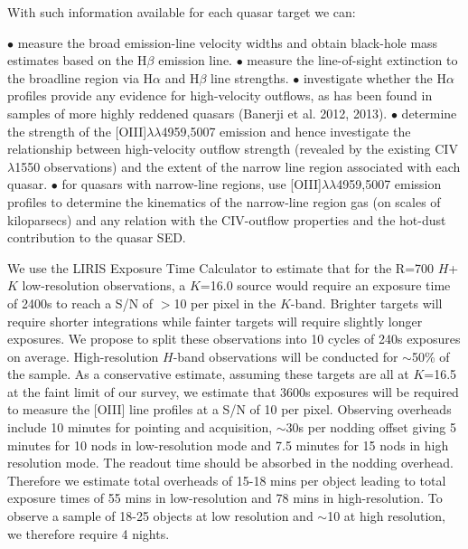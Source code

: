 With such information available for each quasar target we can:

$\bullet$ measure the broad emission-line velocity widths and obtain 
black-hole mass estimates based on the H$\beta$ emission line.\newline
$\bullet$ measure the line-of-sight extinction to the broadline region
via H$\alpha$ and H$\beta$ line strengths.\newline
$\bullet$ investigate whether the H$\alpha$ profiles provide any
evidence for high-velocity outflows, as has been found in samples of
more highly reddened quasars (Banerji et al. 2012, 2013).\newline
$\bullet$ determine the strength of the
[OIII]$\lambda\lambda$4959,5007 emission and hence investigate the
relationship between high-velocity outflow strength (revealed by the existing
CIV$\lambda$1550 observations) and the extent of the narrow line
region associated with each quasar.\newline
$\bullet$ for quasars with narrow-line regions, use 
[OIII]$\lambda\lambda$4959,5007 emission profiles to determine the
kinematics of the narrow-line region gas (on scales of kiloparsecs)
and any relation with the CIV-outflow properties and the hot-dust
contribution to the quasar SED.\newline

We use the LIRIS Exposure Time Calculator to estimate that for the
R=700 $H$+$K$ low-resolution observations, a $K$=16.0 source would require
an exposure time of 2400s to reach a S/N of $>$10 per pixel in the
$K$-band. Brighter targets will require shorter integrations while
fainter targets will require slightly longer exposures. We propose to
split these observations into 10 cycles of 240s exposures on
average. High-resolution $H$-band observations will be conducted for
$\sim$50\% of the sample. As a conservative estimate, assuming these
targets are all at $K$=16.5 at the faint limit of our survey, we
estimate that 3600s exposures will be required to measure the [OIII]
line profiles at a S/N of 10 per pixel.  Observing overheads include
10 minutes for pointing and acquisition, $\sim$30s per nodding offset
giving 5 minutes for 10 nods in low-resolution mode and 7.5 minutes
for 15 nods in high resolution mode.  The readout time should be
absorbed in the nodding overhead. Therefore we estimate total
overheads of 15-18 mins per object leading to total exposure times of
55 mins in low-resolution and 78 mins in high-resolution. To observe a
sample of 18-25 objects at low resolution and $\sim$10 at high
resolution, we therefore require 4 nights.

